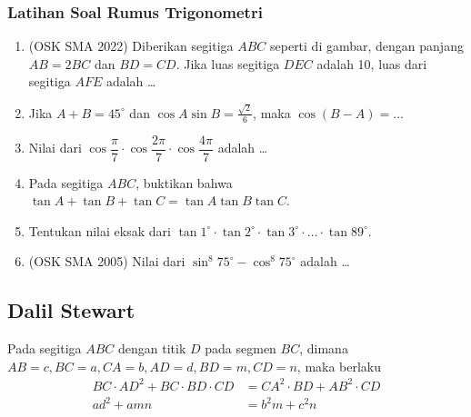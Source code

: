 \documentclass[11pt]{scrartcl}
\begin{document}
    \subsubsection{Latihan Soal Rumus Trigonometri}
    \begin{enumerate}
        \item (OSK SMA 2022) Diberikan segitiga $ABC$ seperti di gambar, dengan panjang $AB = 2BC$ dan $BD = CD$. Jika luas segitiga $DEC$ adalah 10, luas dari segitiga $AFE$ adalah \dots
    
    	\item Jika $A+B=45^\circ$ dan $\cos A\sin B=\frac{\sqrt{2}}{6}$, maka $\cos(B-A)=\dots$
    	
    	\item Nilai dari $\cos \dfrac{\pi}{7}\cdot \cos \dfrac{2\pi}{7} \cdot \cos \dfrac{4\pi}{7}$ adalah \dots
    	
    	\item Pada segitiga $ABC$, buktikan bahwa $\tan A + \tan B + \tan C = \tan A \tan B \tan C$.
    	
    	\item Tentukan nilai eksak dari $\tan 1^\circ \cdot \tan 2^\circ \cdot \tan 3^\circ \cdot \ldots \cdot \tan 89^\circ$.
    	
    	\item (OSK SMA 2005) Nilai dari $\sin^8 75^\circ - \cos^8 75^\circ$ adalah \dots
    \end{enumerate}

\subsection{Dalil Stewart}
    Pada segitiga $ABC$ dengan titik $D$ pada segmen $BC$, dimana $AB=c, BC=a, CA=b, AD=d, BD=m, CD=n$, maka berlaku
    \begin{align*}
        BC \cdot AD^2 + BC \cdot BD \cdot CD &= CA^2 \cdot BD + AB^2 \cdot CD\\
        ad^2+amn &= b^2m+c^2n
    \end{align*}
\begin{center}
\end{center}
\end{document}
